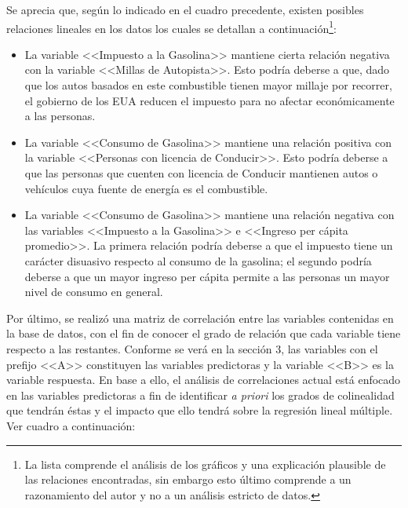 \documentclass[a4paper,10pt]{article}\usepackage[]{graphicx}\usepackage[]{color}
\begin{document}
Se aprecia que, según lo indicado en el cuadro precedente, existen posibles relaciones lineales en los datos los cuales se detallan a continuación\footnote{La lista comprende el análisis de los gráficos y una explicación plausible de las relaciones encontradas, sin embargo esto último comprende a un razonamiento del autor y no a un análisis estricto de datos.}:

\begin{itemize}
  \item La variable <<Impuesto a la Gasolina>> mantiene cierta relación negativa con la variable <<Millas de Autopista>>. Esto podría deberse a que, dado que los autos basados en este combustible tienen mayor millaje por recorrer, el gobierno de los EUA reducen el impuesto para no afectar económicamente a las personas.
  \item La variable <<Consumo de Gasolina>> mantiene una relación positiva con la variable <<Personas con licencia de Conducir>>. Esto podría deberse a que las personas que cuenten con licencia de Conducir mantienen autos o vehículos cuya fuente de energía es el combustible.
  \item La variable <<Consumo de Gasolina>> mantiene una relación negativa con las variables <<Impuesto a la Gasolina>> e <<Ingreso per cápita promedio>>. La primera relación podría deberse a que el impuesto tiene un carácter disuasivo respecto al consumo de la gasolina; el segundo podría deberse a que un mayor ingreso per cápita permite a las personas un mayor nivel de consumo en general.
\end{itemize}

Por último, se realizó una matriz de correlación entre las variables contenidas en la base de datos, con el fin de conocer el grado de relación que cada variable tiene respecto a las restantes. Conforme se verá en la sección 3, las variables con el prefijo <<A>> constituyen las variables predictoras y la variable <<B>> es la variable respuesta. En base a ello, el análisis de correlaciones actual está enfocado en las variables predictoras a fin de identificar \emph{a priori} los grados de colinealidad que tendrán éstas y el impacto que ello tendrá sobre la regresión lineal múltiple. Ver cuadro a continuación:
\end{document}
